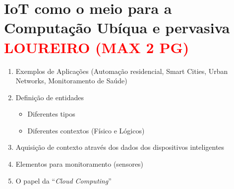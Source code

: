 
\section{IoT como o meio para a Computação Ubíqua e pervasiva 
\textcolor{red}{LOUREIRO (MAX 2 PG)} }
\label{sec:DITCUP}

  \begin{enumerate}
    \item Exemplos de Aplicações (Automação residencial, Smart Cities, 
Urban Networks, Monitoramento de Saúde)
    \item Definição de entidades
      \begin{itemize}
	\item Diferentes tipos
	\item Diferentes contextos (Físico e Lógicos)
      \end{itemize}
    \item Aquisição de contexto através dos dados dos dispositivos 
inteligentes
    \item Elementos para monitoramento (sensores)
    \item O papel da ``\textit{Cloud Computing}''
  \end{enumerate}
